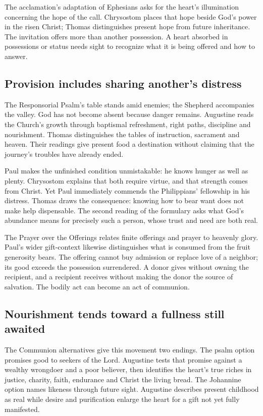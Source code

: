 The acclamation's adaptation of Ephesians asks for the heart's illumination concerning the hope of the call. Chrysostom places that hope beside God's power in the risen Christ; Thomas distinguishes present hope from future inheritance. The invitation offers more than another possession. A heart absorbed in possessions or status needs sight to recognize what it is being offered and how to answer.

\clearpage
\subsection{Provision includes sharing another's distress}
The Responsorial Psalm's table stands amid enemies; the Shepherd accompanies the valley. God has not become absent because danger remains. Augustine reads the Church's growth through baptismal refreshment, right paths, discipline and nourishment. Thomas distinguishes the tables of instruction, sacrament and heaven. Their readings give present food a destination without claiming that the journey's troubles have already ended.

Paul makes the unfinished condition unmistakable: he knows hunger as well as plenty. Chrysostom explains that both require virtue, and that strength comes from Christ. Yet Paul immediately commends the Philippians' fellowship in his distress. Thomas draws the consequence: knowing how to bear want does not make help dispensable. The second reading of the formulary asks what God's abundance means for precisely such a person, whose trust and need are both real.

The Prayer over the Offerings relates finite offerings and prayer to heavenly glory. Paul's wider gift-context likewise distinguishes what is consumed from the fruit generosity bears. The offering cannot buy admission or replace love of a neighbor; its good exceeds the possession surrendered. A donor gives without owning the recipient, and a recipient receives without making the donor the source of salvation. The bodily act can become an act of communion.

\subsection{Nourishment tends toward a fullness still awaited}
The Communion alternatives give this movement two endings. The psalm option promises good to seekers of the Lord. Augustine tests that promise against a wealthy wrongdoer and a poor believer, then identifies the heart's true riches in justice, charity, faith, endurance and Christ the living bread. The Johannine option names likeness through future sight. Augustine describes present childhood as real while desire and purification enlarge the heart for a gift not yet fully manifested.


